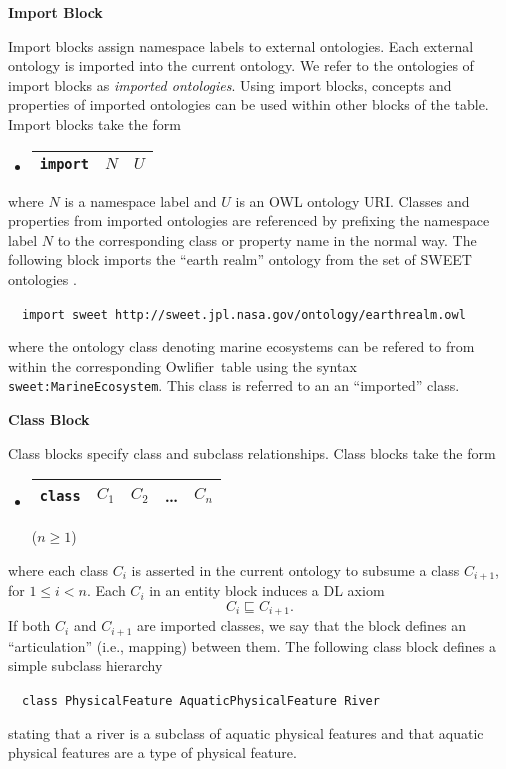 \documentclass[preprint,number]{elsarticle}
\newcommand{\owlifier}{Owlifier}
\newcommand{\mypara}[1]{\vspace{12pt}\noindent\textbf{#1}}
\begin{document}
\mypara{Import Block}  

\mypara{}Import blocks assign namespace labels to external
ontologies. Each external ontology is imported into the current
ontology. We refer to the ontologies of import blocks as
\emph{imported ontologies}.  Using import blocks, concepts and
properties of imported ontologies can be used within other blocks of
the table.  Import blocks take the form
\begin{itemize}
\item[]
  \begin{tabular}{|l|l|l|}\hline
    \texttt{import} & $\textit{N}$ & $\textit{U}$ \\ \hline 
  \end{tabular} 
\end{itemize}
where $\textit{N}$ is a namespace label and $\textit{U}$ is an OWL
ontology URI. Classes and properties from imported ontologies are
referenced by prefixing the namespace label $\textit{N}$ to the
corresponding class or property name in the normal way. The following
block imports the ``earth realm'' ontology from the set of SWEET
ontologies \cite{raskin:_seman_web_for_earth_and}.
\begin{tabbing}
  ~~\texttt{import sweet
    http://sweet.jpl.nasa.gov/ontology/earthrealm.owl}
\end{tabbing}
where the ontology class denoting marine ecosystems can be refered to
from within the corresponding \owlifier\ table using the syntax
\texttt{sweet:MarineEcosystem}. This class is referred to an an
``imported'' class.

\mypara{Class Block}  

\mypara{}Class blocks specify class and subclass relationships. Class
blocks take the form
\begin{itemize}
\item[] 
  \begin{tabular}{|l|l|l|l|l|}\hline
    \texttt{class} & $C_1$ & $C_2$ & \dots & $C_n$ \\ \hline 
  \end{tabular} \hfill ($n \ge 1$)
\end{itemize}
where each class $C_i$ is asserted in the current ontology to subsume
a class $C_{i+1}$, for $1 \le i < n$. Each $C_i$ in an entity block
induces a DL axiom \[C_i \sqsubseteq C_{i+1}.\] If both $C_i$ and
$C_{i+1}$ are imported classes, we say that the block defines an
``articulation'' (i.e., mapping) between them. The following class
block defines a simple subclass hierarchy
\begin{tabbing}
~~\texttt{class PhysicalFeature AquaticPhysicalFeature River}
\end{tabbing}
stating that a river is a subclass of aquatic physical features and
that aquatic physical features are a type of physical feature.
\end{document}
